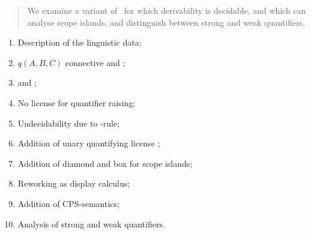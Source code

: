 \documentclass[10pt,a4paper]{llncs}
\begin{document}
\begin{abstract}
  We examine a variant of  \NLCL\ for
  which derivability is decidable, and which can analyse scope
  islands, and distinguish between strong and weak quantifiers.
\end{abstract}

\begin{enumerate}\color{red}
\item Description of the linguistic data;
\item $q(A,B,C)$ connective and \citet{moortgat1996};
\item \citet{barker2007} and \NLCL;
\item No license for quantifier raising;
\item Undecidability due to \I-rule;
\item Addition of unary quantifying license \Q;
\item Addition of diamond and box for scope islands;
\item Reworking as display calculus;
\item Addition of CPS-semantics;
\item Analysis of strong and weak quantifiers.
\end{enumerate}









\end{document}
